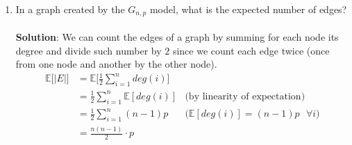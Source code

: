 \documentclass[a4paper]{article}
\begin{document}
\begin{enumerate}
    \item In a graph created by the $G_{n,p}$ model, what is the expected number of edges? \\ \\
    \textbf{Solution}: We can count the edges of a graph by summing for each node its degree and divide such number by $2$ since we count each edge twice (once from one node and another by the other node).
    \begin{align*}
        \mathbb{E}\big[|E|\big] &= \mathbb{E}\Bigg[ \frac{1}{2} \sum_{i = 1}^{n} deg(i) \Bigg] \\
        &= \frac{1}{2} \sum_{i = 1}^{n} \mathbb{E}[deg(i)] & \text{(by linearity of expectation)}\\
        &= \frac{1}{2} \sum_{i = 1}^{n} (n-1)p & \text{($\mathbb{E}[deg(i)] = (n-1)p$ $\forall i$)} \\
        &= \frac{n(n-1)}{2} \cdot p
    \end{align*}


\end{enumerate}
\end{document}
